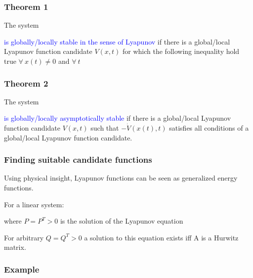 \documentclass[10pt,a4paper]{scrartcl}
\begin{document}
\begin{multicols*}{3}

\subsubsection{Theorem 1}
The system


\textcolor{blue}{is globally/locally stable in the sense of Lyapunov} if there is a global/local Lyapunov function candidate $V(x,t)$ for which the following inequality hold true $\forall\ x(t)\neq 0$ and $\forall\ t$


\subsubsection{Theorem 2}

The system


\textcolor{blue}{is globally/locally asymptotically stable} if there is a global/local Lyapunov function candidate $V(x,t)$ such that $-\dot{V}(x(t),t)$ satisfies all conditions of a global/local Lyapunov function candidate.

\subsubsection{Finding suitable candidate functions}

Using physical insight, Lyapunov functions can be seen as generalized energy functions.

For a linear system:


where $P=P^T>0$ is the solution of the Lyapunov equation


For arbitrary $Q=Q^T>0$ a solution to this equation exists iff A is a Hurwitz matrix.


\subsubsection{Example}


\end{multicols*}
\end{document}

